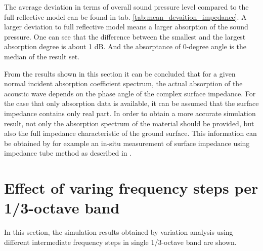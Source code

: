 \noindent The average deviation in terms of overall sound pressure level compared to the full reflective model can be found in tab. \ref{tab:mean_devaition_impedance}. A larger deviation to full reflective model means a larger absorption of the sound pressure. One can see that the difference between the smallest and the largest absorption degree is about 1 dB. And the absorptance of 0-degree angle is the median of the result set.

From the results shown in this section it can be concluded that for a given normal incident absorption coefficient spectrum, the actual absorption of the acoustic wave depends on the phase angle of the complex surface impedance. For the case that only absorption data is available, it can be assumed that the surface impedance contains only real part. In order to obtain a more accurate simulation result, not only the absorption spectrum of the material should be provided, but also the full impedance characteristic of the ground surface. This information can be obtained by for example an in-situ measurement of surface impedance using impedance tube method as described in \cite{hald_situ_2019, wolkesson_2013}.

\section{Effect of varing frequency steps per 1/3-octave band}

In this section, the simulation results obtained by variation analysis using different intermediate frequency steps in single 1/3-octave band are shown.

